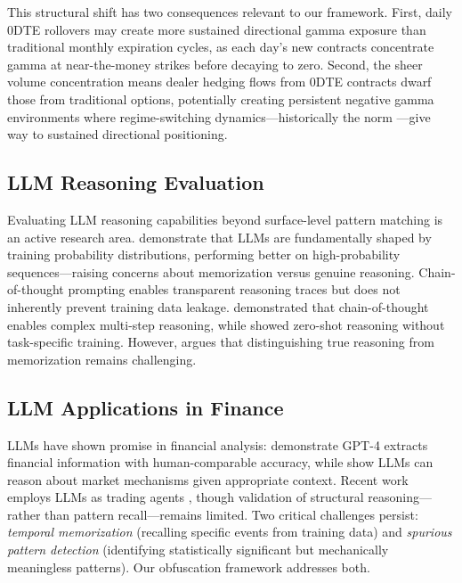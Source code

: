 This structural shift has two consequences relevant to our framework. First, daily 0DTE rollovers may create more sustained directional gamma exposure than traditional monthly expiration cycles, as each day's new contracts concentrate gamma at near-the-money strikes before decaying to zero. Second, the sheer volume concentration means dealer hedging flows from 0DTE contracts dwarf those from traditional options, potentially creating persistent negative gamma environments where regime-switching dynamics---historically the norm \citep{ni2005stock}---give way to sustained directional positioning.

\subsection{LLM Reasoning Evaluation}

Evaluating LLM reasoning capabilities beyond surface-level pattern matching is an active research area. \citet{mccoy2023embers} demonstrate that LLMs are fundamentally shaped by training probability distributions, performing better on high-probability sequences---raising concerns about memorization versus genuine reasoning. Chain-of-thought prompting \citep{openai2024reasoning} enables transparent reasoning traces but does not inherently prevent training data leakage. \citet{wei2022chain} demonstrated that chain-of-thought enables complex multi-step reasoning, while \citet{kojima2022large} showed zero-shot reasoning without task-specific training. However, \citet{marcus2019rebooting} argues that distinguishing true reasoning from memorization remains challenging.

\subsection{LLM Applications in Finance}

LLMs have shown promise in financial analysis: \citet{lopez2023can} demonstrate GPT-4 extracts financial information with human-comparable accuracy, while \citet{kim2024financial} show LLMs can reason about market mechanisms given appropriate context. Recent work employs LLMs as trading agents \citep{yang2024tradingagents}, though validation of structural reasoning---rather than pattern recall---remains limited. Two critical challenges persist: \textit{temporal memorization} (recalling specific events from training data) and \textit{spurious pattern detection} (identifying statistically significant but mechanically meaningless patterns). Our obfuscation framework addresses both.

